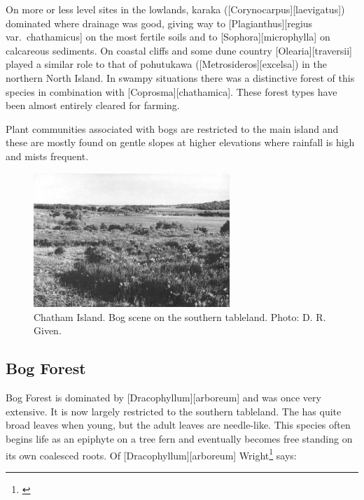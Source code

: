 On more or less level sites in the lowlands, karaka ([Corynocarpus][laevigatus]) dominated where drainage was good, giving way to [Plagianthus][regius var.\ chathamicus] on the most fertile soils and to [Sophora][microphylla] on calcareous sediments.
On coastal cliffs and some dune country [Olearia][traversii] played a similar role to that of pohutukawa ([Metrosideros][excelsa]) in the northern North Island.
In swampy situations there was a distinctive forest of this species in combination with [Coprosma][chathamica].
These forest types have been almost entirely cleared for farming.

Plant communities associated with bogs are restricted to the main island and these are mostly found on gentle slopes at higher elevations where rainfall is high and mists frequent.

\begin{figure}
	\includegraphics[width=0.66\textwidth]{graphics/figure119chatham-island-bog.jpg}
	\centering
	\caption[Chatham Island bog scene]{Chatham Island.
	Bog scene on the southern tableland.
	Photo: D. R. Given.}%
	\label{fig:119chatham-island-bog}
\end{figure}

\subsection{Bog Forest}

Bog Forest is dominated by [Dracophyllum][arboreum] and was once very extensive.
It is now largely restricted to the southern tableland.
The  has quite broad leaves when young, but the adult leaves are needle-like.
This species often begins life as an epiphyte on a tree fern and eventually becomes free standing on its own coalesced roots.
Of [Dracophyllum][arboreum] Wright\footnote{\cite{wright1959soils}} says:

